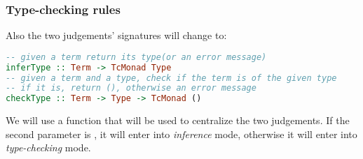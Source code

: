 \subsubsection{Type-checking rules}
Also the two judgements' signatures will change to:

\begin{lstlisting}[language=Haskell]
-- given a term return its type(or an error message)
inferType :: Term -> TcMonad Type
-- given a term and a type, check if the term is of the given type
-- if it is, return (), otherwise an error message
checkType :: Term -> Type -> TcMonad ()
\end{lstlisting}

We will use a  function that will be used to centralize the two judgements. If the second parameter is , it will enter into \emph{inference} mode, otherwise it will enter into \emph{type-checking} mode.

